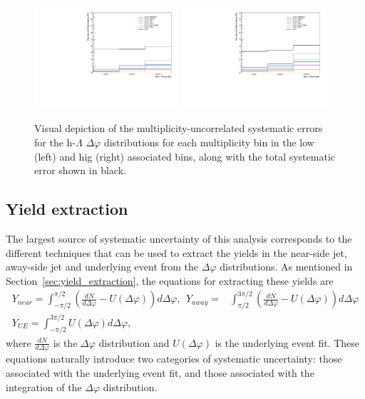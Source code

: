 \begin{figure}[ht]
    \centering
    \includegraphics[width=0.48\textwidth]{figures/analysis/nch_dep_systematics_dphi_postbarlow_lowpt.pdf}
    \includegraphics[width=0.48\textwidth]{figures/analysis/nch_dep_systematics_dphi_postbarlow_highpt.pdf}
    \caption{Visual depiction of the multiplicity-uncorrelated systematic errors for the h-$\Lambda$ $\Delta\varphi$ distributions for each multiplicity bin in the low (left) and hig (right) associated \pt bins, along with the total systematic error shown in black.}
    \label{fig:dphi_nch_dep_systematics_plots}
\end{figure}


\subsection{Yield extraction}
The largest source of systematic uncertainty of this analysis corresponds to the different techniques that can be used to extract the yields in the near-side jet, away-side jet and underlying event from the $\Delta\varphi$ distributions. As mentioned in Section~\ref{sec:yield_extraction}, the equations for extracting these yields are
%
\begin{eqnarray}
    Y_{near} = \int_{-\pi/2}^{\pi/2} (\frac{dN}{d\Delta\varphi}- U(\Delta\varphi))d\Delta\varphi,  \  \ Y_{away} = & \int_{\pi/2}^{3\pi/2} (\frac{dN}{d\Delta\varphi}- U(\Delta\varphi))d\Delta\varphi 
    \label{eq:jet_yields}
    \\ 
    Y_{UE} = \int_{-\pi/2}^{3\pi/2} U(\Delta\varphi)d\Delta\varphi,
    \label{eq:ue_yield}
\end{eqnarray}
%
where $\frac{dN}{d\Delta\varphi}$ is the $\Delta\varphi$ distribution and $U(\Delta\varphi)$ is the underlying event fit. These equations naturally introduce two categories of systematic uncertainty: those associated with the underlying event fit, and those associated with the integration of the $\Delta\varphi$ distribution. 


